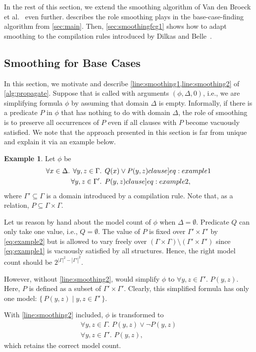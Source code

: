 \documentclass{article}
\theoremstyle{definition}
\newtheorem{example}{Example}
\theoremstyle{remark}
\begin{document}
In the rest of this section, we extend the smoothing algorithm of Van den Broeck
et al.~ even further.
 describes the role smoothing plays in the
base-case-finding algorithm from \cref{sec:main}. Then, \cref{sec:smoothingfcg1}
shows how to adapt smoothing to the compilation rules introduced by Dilkas and
Belle~.

\subsection{Smoothing for Base Cases}\label{sec:smoothingbase}

In this section, we motivate and describe \cref{line:smoothing1,line:smoothing2}
of \cref{alg:propagate}. Suppose that \Propagate is called with arguments
$(\phi, \Delta, 0)$, i.e., we are simplifying formula $\phi$ by assuming that
domain $\Delta$ is empty. Informally, if there is a predicate $P$ in $\phi$ that
has nothing to do with domain $\Delta$, the role of smoothing is to preserve all
occurrences of $P$ even if all clauses with $P$ become vacuously satisfied. We
note that the approach presented in this section is far from unique and explain
it via an example below.

\begin{example}\label{example:basecasesmoothing}
  Let $\phi$ be
  \begin{align}
    \forall x \in \Delta\text{. }\forall y, z \in \Gamma&\text{. }Q(x) \lor P(y, z)\label[clause]{eq:example1}\\
    \forall y, z \in \Gamma'&\text{. }P(y, z)\label[clause]{eq:example2},
  \end{align}
  where $\Gamma' \subseteq \Gamma$ is a domain introduced by a compilation rule.
  Note that, as a relation, $P \subseteq \Gamma \times \Gamma$.

  Let us reason by hand about the model count of $\phi$ when
  $\Delta = \emptyset$. Predicate $Q$ can only take one value, i.e.,
  $Q = \emptyset$. The value of $P$ is fixed over $\Gamma' \times \Gamma'$ by
  \cref{eq:example2} but is allowed to vary freely over
  $(\Gamma \times \Gamma) \setminus (\Gamma' \times \Gamma')$ since
  \cref{eq:example1} is vacuously satisfied by all structures. Hence, the right
  model count should be $2^{|\Gamma|^2 - |\Gamma'|^2}$.

  However, without \cref{line:smoothing2}, \Propagate would simplify $\phi$ to
  $\forall y, z \in \Gamma'\text{. }P(y, z)$. Here, $P$ is defined as a subset
  of $\Gamma' \times \Gamma'$. Clearly, this simplified formula has only one
  model: $\{\, P(y, z) \mid y, z \in \Gamma' \,\}$.

  With \cref{line:smoothing2} included, $\phi$ is transformed to
  \begin{gather*}
    \forall y, z \in \Gamma\text{. }P(y, z) \lor \neg P(y, z)\\
    \forall y, z \in \Gamma'\text{. }P(y, z),
  \end{gather*}
  which retains the correct model count.
\end{example}
\end{document}
